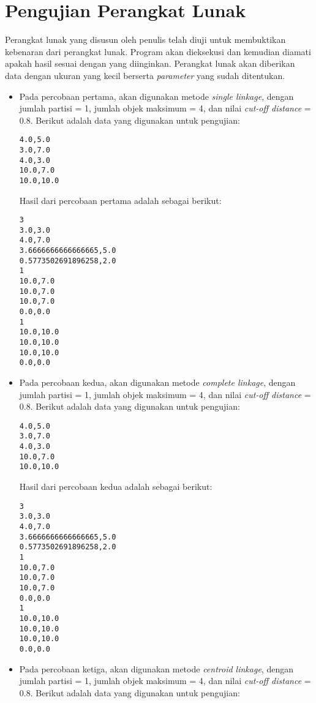 \section{Pengujian Perangkat Lunak}

Perangkat lunak yang disusun oleh penulis telah diuji untuk membuktikan kebenaran dari perangkat lunak. Program akan dieksekusi dan kemudian diamati apakah hasil sesuai dengan yang diinginkan. Perangkat lunak akan diberikan data dengan ukuran yang kecil berserta \textit{parameter} yang sudah ditentukan. 

\begin{itemize}

\item Pada percobaan pertama, akan digunakan metode \textit{single linkage}, dengan jumlah partisi = 1, jumlah objek maksimum = 4, dan nilai \textit{cut-off distance} = 0.8. Berikut adalah data yang digunakan untuk pengujian:

\begin{verbatim}
4.0,5.0
3.0,7.0
4.0,3.0
10.0,7.0
10.0,10.0
\end{verbatim}

Hasil dari percobaan pertama adalah sebagai berikut:

\begin{verbatim}
3
3.0,3.0
4.0,7.0
3.6666666666666665,5.0
0.5773502691896258,2.0
1
10.0,7.0
10.0,7.0
10.0,7.0
0.0,0.0
1
10.0,10.0
10.0,10.0
10.0,10.0
0.0,0.0
\end{verbatim}

\item Pada percobaan kedua, akan digunakan metode \textit{complete linkage}, dengan jumlah partisi = 1, jumlah objek maksimum = 4, dan nilai \textit{cut-off distance} = 0.8. Berikut adalah data yang digunakan untuk pengujian:

\begin{verbatim}
4.0,5.0
3.0,7.0
4.0,3.0
10.0,7.0
10.0,10.0
\end{verbatim}

Hasil dari percobaan kedua adalah sebagai berikut:

\begin{verbatim}
3
3.0,3.0
4.0,7.0
3.6666666666666665,5.0
0.5773502691896258,2.0
1
10.0,7.0
10.0,7.0
10.0,7.0
0.0,0.0
1
10.0,10.0
10.0,10.0
10.0,10.0
0.0,0.0
\end{verbatim}

\item Pada percobaan ketiga, akan digunakan metode \textit{centroid linkage}, dengan jumlah partisi = 1, jumlah objek maksimum = 4, dan nilai \textit{cut-off distance} = 0.8. Berikut adalah data yang digunakan untuk pengujian:


\end{itemize}
